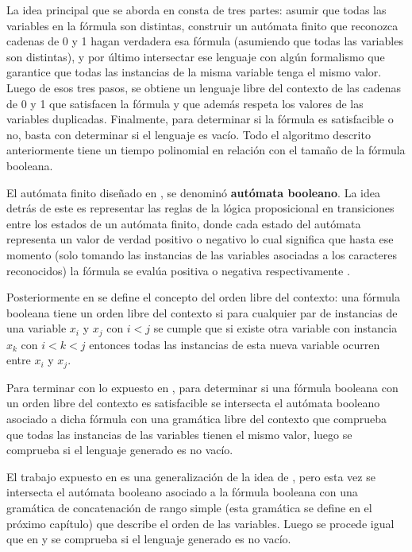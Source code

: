 \documentclass[12pt]{article}
\begin{document}
La idea principal que se aborda en \cite{aCFSAT} consta de tres partes: asumir que todas las variables en 
la fórmula son distintas, construir un autómata finito que reconozca cadenas de 0 y 1 hagan verdadera esa 
fórmula (asumiendo que todas las variables son distintas), y por último intersectar ese lenguaje con algún 
formalismo que garantice que todas las instancias de la misma variable tenga el mismo valor. Luego de esos 
tres pasos, se obtiene un lenguaje libre del contexto de las cadenas de 0 y 1 que satisfacen la fórmula y 
que además respeta los valores de las variables duplicadas.  Finalmente, para determinar si la fórmula es 
satisfacible o no, basta con determinar si el lenguaje es vacío. Todo el algoritmo descrito anteriormente tiene un tiempo polinomial en relación con el 
tamaño de la fórmula booleana.

El autómata finito diseñado en \cite{aCFSAT}, se denominó \textbf{autómata booleano}. La idea detrás de este es representar 
las reglas de la lógica proposicional en transiciones entre los estados de un autómata finito, donde cada estado del autómata representa un valor de verdad positivo o 
negativo lo cual significa que hasta ese momento (solo tomando las instancias de las variables asociadas a los 
caracteres reconocidos) la fórmula se evalúa positiva o negativa respectivamente \cite{aCFSAT}.

Posteriormente en \cite{aCFSAT} se define el concepto del orden libre del contexto: una fórmula booleana tiene un orden libre del contexto si para cualquier par de instancias de una variable $x_i$ y $x_j$ con $i<j$ se
cumple que si existe otra variable con instancia $x_k$ con $i<k<j$ entonces todas las instancias de esta nueva
variable ocurren entre $x_i$ y $x_j$.

Para terminar con lo expuesto en \cite{aCFSAT}, para determinar si una fórmula booleana con un orden libre del contexto 
es satisfacible se intersecta el autómata booleano asociado a dicha fórmula con una gramática libre del contexto 
que comprueba que todas las instancias de las variables tienen el mismo valor, luego se comprueba si el lenguaje
generado es no vacío.

El trabajo expuesto en \cite{aSRCSAT} es una generalización de la idea de \cite{aCFSAT}, pero esta vez se intersecta
el autómata booleano asociado a la fórmula booleana con una gramática de concatenación de rango simple (esta gramática
se define en el próximo capítulo) que describe el orden de las variables. Luego se procede igual que en \cite{aCFSAT}
y se comprueba si el lenguaje generado es no vacío.
\end{document}

